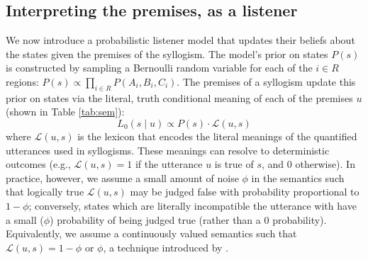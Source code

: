 \documentclass[floatsintext, doc]{apa6}
\newcommand{\ndg}[1]{{\textcolor{Green}{[ndg: #1]}}}
\begin{document}
\subsection{Interpreting the premises, as a listener}
We now introduce a probabilistic listener model that updates their beliefs about the states given the premises of the syllogism. 
The model's prior on states $P(s)$ is constructed by sampling a Bernoulli random variable for each of the $i \in R$ regions: $P(s) \propto \prod_{i \in R} P(A_{i}, B_{i}, C_{i})$. %
The premises of a syllogism update this prior on states via the literal, truth conditional meaning of each of the premises $u$ (shown in Table \ref{tab:sem}):
\begin{equation}
L_0(s \mid u ) \propto P(s)\cdot \mathcal{L}(u, s) 
\label{eq:L0}
\end{equation}
\noindent where $\mathcal{L}(u, s)$ is the lexicon that encodes the literal meanings of the quantified utterances used in syllogisms. 
These meanings can resolve to deterministic outcomes (e.g., $\mathcal{L}(u, s) = 1$ if the utterance $u$ is true of $s$, and 0 otherwise). 
In practice, however, we assume a small amount of noise $\phi$ in the semantics such that logically true $\mathcal{L}(u, s)$ may be judged false with probability proportional to $1-\phi$; conversely, states which are literally incompatible the utterance with have a small ($\phi$) probability of being judged true (rather than a 0 probability).
Equivalently, we assume a continuously valued semantics such that $\mathcal{L}(u, s) = 1-\phi$ or $\phi$, a technique introduced by .
\end{document}
